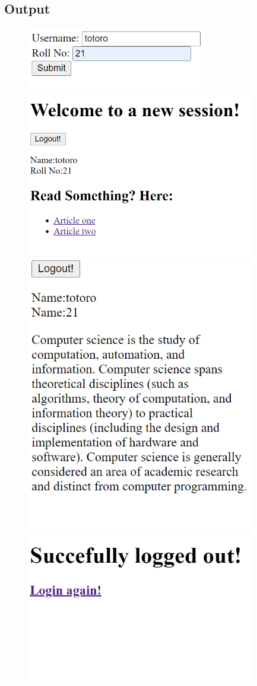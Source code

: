 \documentclass{article}
\begin{document}
\subsection*{Output}
\begin{figure}[H]
  \centering
  \includegraphics[width=8cm]{3/out.png}
  \includegraphics[width=10cm]{3/out2.png}
  \includegraphics[width=10cm]{3/out3.png}
  \includegraphics[width=10cm]{3/out4.png}
\end{figure}
\end{document}
